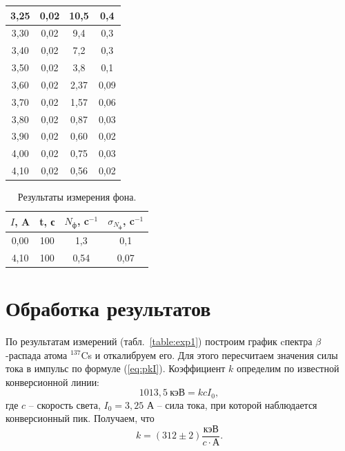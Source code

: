 \documentclass[a4paper,12pt]{article} %
\begin{document}
\begin{table}[H]
\begin{tabular}{|c|c|c|c|}
				3,25   & 0,02          & 10,5          & 0,4                  \\ \hline
				3,30   & 0,02          & 9,4           & 0,3                  \\ \hline
				3,40   & 0,02          & 7,2           & 0,3                  \\ \hline
				3,50   & 0,02          & 3,8           & 0,1                  \\ \hline
				3,60   & 0,02          & 2,37          & 0,09                 \\ \hline
				3,70   & 0,02          & 1,57          & 0,06                 \\ \hline
				3,80   & 0,02          & 0,87          & 0,03                 \\ \hline
				3,90   & 0,02          & 0,60          & 0,02                 \\ \hline
				4,00   & 0,02          & 0,75          & 0,03                 \\ \hline
				4,10   & 0,02              & 0,56          & 0,02                 \\ \hline
			\end{tabular}
		\end{table}
		
		
	
		\begin{table}[H]
			\caption{Результаты измерения фона.}
			\label{table:exp2}
			\begin{tabular}{|c|c|c|c|}
				\hline
				$I$, A & t, с & $N_\text{ф}$, c$^{-1}$ & $\sigma_{N_\text{ф}}$, c$^{-1}$ \\ \hline
				0,00   & 100  & 1,3                    & 0,1                             \\ \hline
				4,10   & 100  & 0,54                   & 0,07                            \\ \hline
			\end{tabular}
		\end{table}
	
	\newpage
	\section{Обработка результатов}
		По результатам измерений (табл.~\ref{table:exp1}) построим график cпектра $\beta$-распада атома $^{137}$Cs и откалибруем его. Для этого пересчитаем значения силы тока в импульс по формуле (\ref{eq:pkI}). Коэффициент $k$ определим по известной конверсионной линии:
			$$1013,5 \ \text{кэВ} = kcI_0,$$
		где $c$ -- скорость света, $I_0 = 3,25$ А -- сила тока, при которой наблюдается конверсионный пик. Получаем, что $$k = (312 \pm 2) \frac{\text{кэВ}}{c\cdot\text{А}}.$$
		
\end{document}
